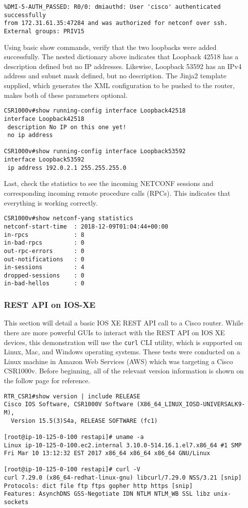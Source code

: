 \begin{verbatim}
%DMI-5-AUTH_PASSED: R0/0: dmiauthd: User 'cisco' authenticated successfully
from 172.31.61.35:47284 and was authorized for netconf over ssh. External groups: PRIV15
\end{verbatim}

Using basic show commands, verify that the two loopbacks were added
successfully. The nested dictionary above indicates that Loopback 42518 has a
description defined but no IP addresses. Likewise, Loopback 53592 has an IPv4
address and subnet mask defined, but no description. The Jinja2 template
supplied, which generates the XML configuration to be pushed to the router,
makes both of these parameters optional.

\begin{verbatim}
CSR1000v#show running-config interface Loopback42518
interface Loopback42518
 description No IP on this one yet!
 no ip address

CSR1000v#show running-config interface Loopback53592
interface Loopback53592
 ip address 192.0.2.1 255.255.255.0
\end{verbatim}

Last, check the statistics to see the incoming NETCONF sessions and
corresponding incoming remote procedure calls (RPCs). This indicates that
everything is working correctly.

\begin{verbatim}
CSR1000v#show netconf-yang statistics 
netconf-start-time  : 2018-12-09T01:04:44+00:00
in-rpcs             : 8
in-bad-rpcs         : 0
out-rpc-errors      : 0
out-notifications   : 0
in-sessions         : 4
dropped-sessions    : 0
in-bad-hellos       : 0
\end{verbatim}

\subsubsection{REST API on IOS-XE}
This section will detail a basic IOS XE REST API call to a Cisco router. While
there are more powerful GUIs to interact with the REST API on IOS XE devices,
this demonstration will use the \verb|curl| CLI utility, which is supported on
Linux, Mac, and Windows operating systems. These tests were conducted on a
Linux machine in Amazon Web Services (AWS) which was targeting a Cisco
CSR1000v. Before beginning, all of the relevant version information is shown
on the follow page for reference.

\begin{verbatim}
RTR_CSR1#show version | include RELEASE  
Cisco IOS Software, CSR1000V Software (X86_64_LINUX_IOSD-UNIVERSALK9-M),
  Version 15.5(3)S4a, RELEASE SOFTWARE (fc1)

[root@ip-10-125-0-100 restapi]# uname -a
Linux ip-10-125-0-100.ec2.internal 3.10.0-514.16.1.el7.x86_64 #1 SMP
Fri Mar 10 13:12:32 EST 2017 x86_64 x86_64 x86_64 GNU/Linux

[root@ip-10-125-0-100 restapi]# curl -V
curl 7.29.0 (x86_64-redhat-linux-gnu) libcurl/7.29.0 NSS/3.21 [snip]
Protocols: dict file ftp ftps gopher http https [snip]
Features: AsynchDNS GSS-Negotiate IDN NTLM NTLM_WB SSL libz unix-sockets
\end{verbatim}

